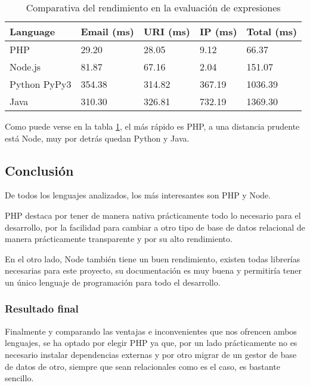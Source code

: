 \begin{table}[htbp]
    \begin{center}
        \begin{tabular}{| m{2.8cm} || m{2cm} | m{2cm} | m{2cm} | m{2cm} |}
            \hline
            Language & Email (ms) & URI (ms) & IP (ms) & Total (ms) \\ 
            \hline \hline 
            PHP & 29.20 & 28.05 & 9.12 & 66.37\\
            Node.js & 81.87 & 67.16 & 2.04 & 151.07\\
            Python PyPy3 & 354.38 & 314.82 & 367.19 & 1036.39\\
            Java & 310.30 & 326.81 & 732.19 & 1369.30 \\
            \hline
        \end{tabular}
    \caption{Comparativa del rendimiento en la evaluación de expresiones }
    \label{table:regex_benchmark}
    \end{center}
\end{table}

Como puede verse en la tabla \ref{table:regex_benchmark}, el más rápido es PHP, a una distancia prudente está Node, muy por detrás quedan Python y Java. 
\subsection{Conclusión}
De todos los lenguajes analizados, los más interesantes son PHP y Node.

PHP destaca por tener de manera nativa prácticamente todo lo necesario para el desarrollo, por la facilidad para cambiar a otro tipo de base de datos relacional de manera prácticamente transparente y por su alto rendimiento.

En el otro lado, Node también tiene un buen rendimiento, existen todas librerías necesarias para este proyecto, su documentación es muy buena y permitiría tener un único lenguaje de programación para todo el desarrollo. 

\subsubsection{Resultado final}
Finalmente y comparando las ventajas e inconvenientes que nos ofrencen ambos lenguajes, se ha optado por elegir PHP ya que, por un lado prácticamente no es necesario instalar dependencias externas y por otro migrar de un gestor de base de datos de otro, siempre que sean relacionales como es el caso, es bastante sencillo.